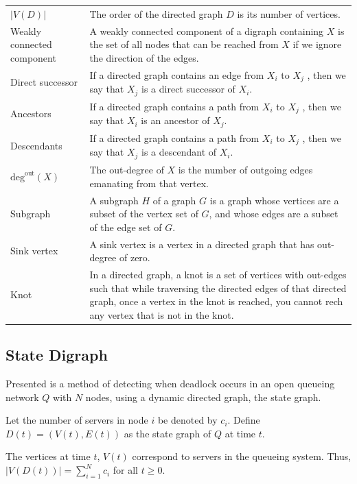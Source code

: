 \documentclass{article}
\begin{document}
\begin{tabular}{ p{5cm} p{10cm} }
  $\left| V(D) \right|$        & The order of the directed graph $D$ is its number of vertices. \\
  Weakly connected component   & A weakly connected component of a digraph containing $X$ is the set of all nodes that can be reached from $X$ if we ignore the direction of the edges. \\
  Direct successor             & If a directed graph contains an edge from $X_i$ to $X_j$ , then we say that $X_j$ is a direct successor of $X_i$. \\
  Ancestors                    & If a directed graph contains a path from $X_i$ to $X_j$ , then we say that $X_i$ is an ancestor of $X_j$. \\
  Descendants                  & If a directed graph contains a path from $X_i$ to $X_j$ , then we say that $X_j$ is a descendant of $X_i$. \\
  $\text{deg}^{\text{out}}(X)$ & The out-degree of $X$ is the number of outgoing edges emanating from that vertex. \\
  Subgraph                     & A subgraph $H$ of a graph $G$ is a graph whose vertices are a subset of the vertex set of $G$, and whose edges are a subset of the edge set of $G$. \\
  Sink vertex                  & A sink vertex is a vertex in a directed graph that has out-degree of zero.\\
  Knot                         & In a directed graph, a knot is a set of vertices with out-edges such that while traversing the directed edges of that directed graph, once a vertex in the knot is reached, you cannot rech any vertex that is not in the knot.\\
\end{tabular}


\subsection{State Digraph}

Presented is a method of detecting when deadlock occurs in an open queueing network $Q$ with $N$ nodes, using a dynamic directed graph, the state graph.

Let the number of servers in node $i$ be denoted by $c_i$.
Define $D(t)=(V(t), E(t))$ as the state graph of $Q$ at time $t$.

The vertices at time \(t\), \(V(t)\) correspond to servers in the
queueing system.
Thus, $\left| V\left(D\left(t\right)\right) \right| = \sum_{i=1}^N c_i$ for all $t \geq 0$.
\end{document}
